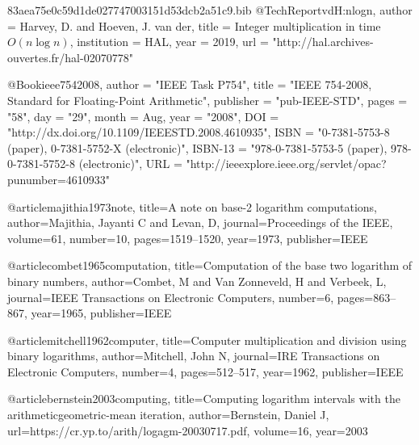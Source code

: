 \begin{filecontents}{83aea75e0c59d1de027747003151d53dcb2a51c9.bib}
@TechReport{vdH:nlogn,
  author      = {Harvey, D. and Hoeven, J. van der},
  title       = {Integer multiplication in time {$O(n \log n)$}},
  institution = {HAL},
  year        = {2019},
  url         = "http://hal.archives-ouvertes.fr/hal-02070778"
}

@Book{ieee7542008,
  author =       "{IEEE Task P754}",
  title =        "{IEEE 754-2008, Standard for Floating-Point
                 Arithmetic}",
  publisher =    "pub-IEEE-STD",
  pages =        "58",
  day =          "29",
  month =        Aug,
  year =         "2008",
  DOI =          "http://dx.doi.org/10.1109/IEEESTD.2008.4610935",
  ISBN =         "0-7381-5753-8 (paper), 0-7381-5752-X (electronic)",
  ISBN-13 =      "978-0-7381-5753-5 (paper), 978-0-7381-5752-8
                 (electronic)",
  URL =          "http://ieeexplore.ieee.org/servlet/opac?punumber=4610933"
}

@article{majithia1973note,
  title={A note on base-2 logarithm computations},
  author={Majithia, Jayanti C and Levan, D},
  journal={Proceedings of the IEEE},
  volume={61},
  number={10},
  pages={1519--1520},
  year={1973},
  publisher={IEEE}
}

@article{combet1965computation,
  title={Computation of the base two logarithm of binary numbers},
  author={Combet, M and Van Zonneveld, H and Verbeek, L},
  journal={IEEE Transactions on Electronic Computers},
  number={6},
  pages={863--867},
  year={1965},
  publisher={IEEE}
}

@article{mitchell1962computer,
  title={Computer multiplication and division using binary logarithms},
  author={Mitchell, John N},
  journal={IRE Transactions on Electronic Computers},
  number={4},
  pages={512--517},
  year={1962},
  publisher={IEEE}
}

@article{bernstein2003computing,
  title={Computing logarithm intervals with the arithmeticgeometric-mean iteration},
  author={Bernstein, Daniel J},
  url={https://cr.yp.to/arith/logagm-20030717.pdf},
  volume={16},
  year={2003}
}

\end{filecontents}
\documentclass[a4paper,10pt]{article}


\usepackage{palatino}

\usepackage[margin=1.2in]{geometry}
\usepackage{amsmath, amsthm,amsfonts,amssymb}
\usepackage{graphicx}
\usepackage{fixltx2e}
\usepackage{listings}
\usepackage{algorithm}

